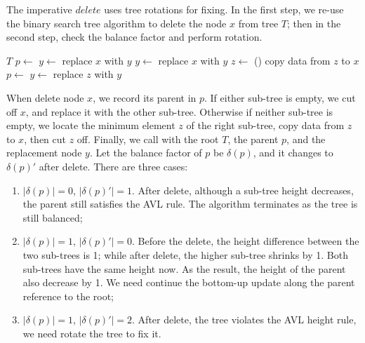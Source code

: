 \documentclass[b5paper]{article}
\begin{document}
The imperative $delete$ uses tree rotations for fixing. In the first step, we re-use the binary search tree algorithm to delete the node $x$ from tree $T$; then in the second step, check the balance factor and perform rotation.

\begin{algorithmic}[1]
    \State \Return $T$
  \EndIf
  \State $p \gets$ 
    \State $y \gets $ 
    \State replace $x$ with $y$
    \State $y \gets $ 
    \State replace $x$ with $y$
  \Else
    \State $z \gets$ ()
    \State copy data from $z$ to $x$
    \State $p \gets$ 
    \State $y \gets$ 
    \State replace $z$ with $y$
  \EndIf
  \State \Return {}
\EndFunction
\end{algorithmic}

When delete node $x$, we record its parent in $p$. If either sub-tree is empty, we cut off $x$, and replace it with the other sub-tree. Otherwise if neither sub-tree is empty, we locate the minimum element $z$ of the right sub-tree, copy data from $z$ to $x$, then cut $z$ off. Finally, we call  with the root $T$, the parent $p$, and the replacement node $y$. Let the balance factor of $p$ be $\delta(p)$, and it changes to $\delta(p)'$ after delete. There are three cases:

\begin{enumerate}
\item $|\delta(p)| = 0$, $|\delta(p)'| = 1$. After delete, although a sub-tree height decreases, the parent still satisfies the AVL
rule. The algorithm terminates as the tree is still balanced;

\item $|\delta(p)| = 1$, $|\delta(p)'| = 0$. Before the delete, the height difference between the two sub-trees is 1; while after delete, the higher sub-tree shrinks by 1. Both sub-trees have the same height now. As the result, the height of the parent also decrease by 1. We need continue the bottom-up update along the parent reference to the root;

\item $|\delta(p)| = 1$, $|\delta(p)'| = 2$. After delete, the tree violates the AVL height rule, we need rotate the tree to fix it.
\end{enumerate}
\end{document}
